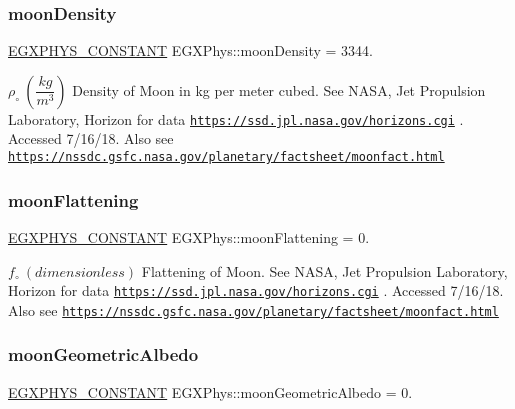 \subsubsection{\texorpdfstring{moon\+Density}{moonDensity}}
{\footnotesize\ttfamily \mbox{\hyperlink{group___e_g_x_phys-_constants-_macros_ga76980d288494ce1714c9ac68a95ba702}{E\+G\+X\+P\+H\+Y\+S\+\_\+\+C\+O\+N\+S\+T\+A\+NT}} E\+G\+X\+Phys\+::moon\+Density = 3344.}

$\rho_{\circ} \ (\dfrac{kg}{m^3})$ Density of Moon in kg per meter cubed. See N\+A\+SA, Jet Propulsion Laboratory, Horizon for data \href{https://ssd.jpl.nasa.gov/horizons.cgi}{\tt https\+://ssd.\+jpl.\+nasa.\+gov/horizons.\+cgi} . Accessed 7/16/18. Also see \href{https://nssdc.gsfc.nasa.gov/planetary/factsheet/moonfact.html}{\tt https\+://nssdc.\+gsfc.\+nasa.\+gov/planetary/factsheet/moonfact.\+html} \mbox{\label{group___e_g_x_phys-_constants-_astrophysics-_solar_system-_moon-_bulk_ga57e50ee2a3244104e2f6697d035a8680}} 
\subsubsection{\texorpdfstring{moon\+Flattening}{moonFlattening}}
{\footnotesize\ttfamily \mbox{\hyperlink{group___e_g_x_phys-_constants-_macros_ga76980d288494ce1714c9ac68a95ba702}{E\+G\+X\+P\+H\+Y\+S\+\_\+\+C\+O\+N\+S\+T\+A\+NT}} E\+G\+X\+Phys\+::moon\+Flattening = 0.}

$f_{\circ} \ (dimensionless)$ Flattening of Moon. See N\+A\+SA, Jet Propulsion Laboratory, Horizon for data \href{https://ssd.jpl.nasa.gov/horizons.cgi}{\tt https\+://ssd.\+jpl.\+nasa.\+gov/horizons.\+cgi} . Accessed 7/16/18. Also see \href{https://nssdc.gsfc.nasa.gov/planetary/factsheet/moonfact.html}{\tt https\+://nssdc.\+gsfc.\+nasa.\+gov/planetary/factsheet/moonfact.\+html} \mbox{\label{group___e_g_x_phys-_constants-_astrophysics-_solar_system-_moon-_bulk_gacd09d7fa3ad8869988fe6d469ea68cff}} 
\subsubsection{\texorpdfstring{moon\+Geometric\+Albedo}{moonGeometricAlbedo}}
{\footnotesize\ttfamily \mbox{\hyperlink{group___e_g_x_phys-_constants-_macros_ga76980d288494ce1714c9ac68a95ba702}{E\+G\+X\+P\+H\+Y\+S\+\_\+\+C\+O\+N\+S\+T\+A\+NT}} E\+G\+X\+Phys\+::moon\+Geometric\+Albedo = 0.}

